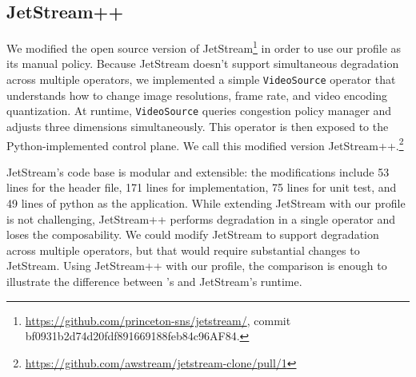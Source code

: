 \subsection{JetStream++}
\label{sub:jetstream++}

We modified the open source version of
JetStream\footnote{\url{https://github.com/princeton-sns/jetstream/}, \newline
  commit bf0931b2d74d20fdf891669188feb84c96AF84.} in order to use our profile as
its manual policy. Because JetStream doesn't support simultaneous degradation
across multiple operators, we implemented a simple \texttt{VideoSource} operator
that understands how to change image resolutions, frame rate, and video encoding
quantization. At runtime, \texttt{VideoSource} queries congestion policy manager
and adjusts three dimensions simultaneously. This operator is then exposed to
the Python-implemented control plane. We call this modified version
JetStream++.\footnote{\url{https://github.com/awstream/jetstream-clone/pull/1}}

JetStream's code base is modular and extensible: the modifications include 53
lines for the header file, 171 lines for implementation, 75 lines for unit test,
and 49 lines of python as the application. While extending JetStream with our
profile is not challenging, JetStream++ performs degradation in a single
operator and loses the composability. We could modify JetStream to support
degradation across multiple operators, but that would require substantial
changes to JetStream. Using JetStream++ with our profile, the comparison is
enough to illustrate the difference between \sysname{}'s and JetStream's
runtime.


